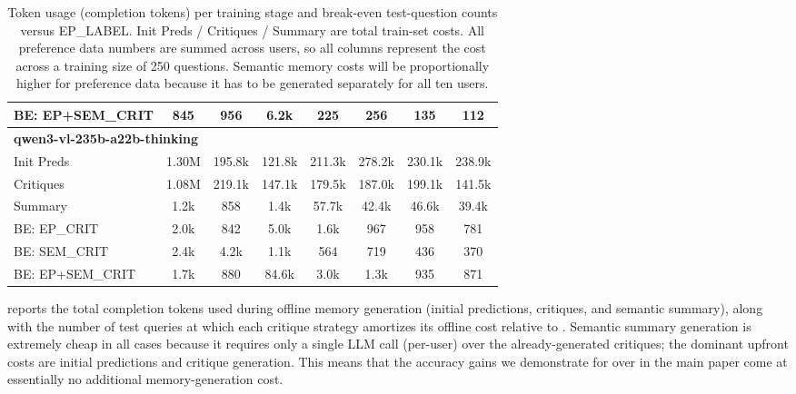 \begin{table}[t]
\begin{tabular}{lccccccc}
\quad BE: EP+SEM\_CRIT & 845 & 956 & 6.2k & 225 & 256 & 135 & 112 \\
\hline
\multicolumn{8}{l}{\textbf{qwen3-vl-235b-a22b-thinking}} \\
\quad Init Preds & 1.30M & 195.8k & 121.8k & 211.3k & 278.2k & 230.1k & 238.9k \\
\quad Critiques & 1.08M & 219.1k & 147.1k & 179.5k & 187.0k & 199.1k & 141.5k \\
\quad Summary & 1.2k & 858 & 1.4k & 57.7k & 42.4k & 46.6k & 39.4k \\
\quad BE: EP\_CRIT & 2.0k & 842 & 5.0k & 1.6k & 967 & 958 & 781 \\
\quad BE: SEM\_CRIT & 2.4k & 4.2k & 1.1k & 564 & 719 & 436 & 370 \\
\quad BE: EP+SEM\_CRIT & 1.7k & 880 & 84.6k & 3.0k & 1.3k & 935 & 871 \\
\bottomrule
\end{tabular}
\caption{Token usage (completion tokens) per training stage and break-even test-question counts versus EP\_LABEL. Init Preds / Critiques / Summary are total train-set costs. All preference data numbers are summed across users, so all columns represent the cost across a training size of 250 questions. Semantic memory costs will be proportionally higher for preference data because it has to be generated separately for all ten users.}
\label{tab:usage}
\end{table}

 reports the total completion tokens used during offline memory generation (initial predictions, critiques, and semantic summary), along with the number of test queries at which each critique strategy amortizes its offline cost relative to \EPLABEL{}. Semantic summary generation is extremely cheap in all cases because it requires only a single LLM call (per-user) over the already-generated critiques; the dominant upfront costs are initial predictions and critique generation. This means that the accuracy gains we demonstrate for \EPSEMCRIT{} over \EPCRIT{} in the main paper come at essentially no additional memory-generation cost.

